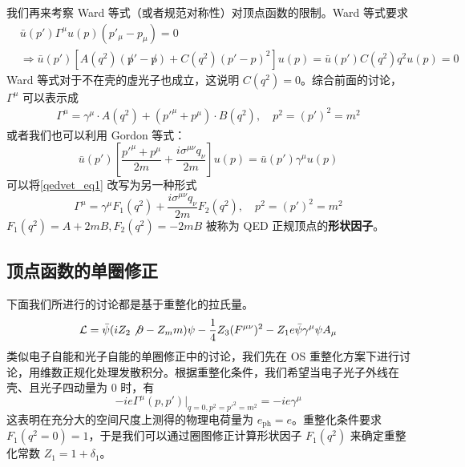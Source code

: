 我们再来考察 Ward 等式（或者规范对称性）对顶点函数的限制。Ward 等式要求
\begin{equation}
\begin{aligned}
&\bar u(p')\Gamma^\mu u(p) (p'_\mu-p_\mu) = 0\\
&\Rightarrow \bar u(p')\left[A(q^2)(\not p'-\not p)+ C(q^2)(p'-p)^2\right] u(p)=\bar u(p')C(q^2)q^2 u(p)=0
\end{aligned}
\end{equation}
Ward 等式对于不在壳的虚光子也成立，这说明 $C(q^2) = 0$。综合前面的讨论，$\Gamma^\mu$ 可以表示成
\begin{equation}\label{qedvet_eq1}
\begin{aligned}
\Gamma^\mu = \gamma^\mu\cdot A(q^2) + ({p'}^\mu + p^\mu)\cdot B(q^2),\quad p^2=(p')^2=m^2
\end{aligned}
\end{equation}
或者我们也可以利用 Gordon 等式：
\begin{equation}
\bar u(p') \left[\frac{{p'}^\mu+p^\mu}{2m}+\frac{i\sigma^{\mu\nu}q_\nu}{2m}\right]u(p)=\bar u(p')\gamma^\mu u(p)
\end{equation}
可以将\autoref{qedvet_eq1} 改写为另一种形式
\begin{equation}
\Gamma^\mu = \gamma^\mu F_1(q^2) + \frac{i\sigma^{\mu\nu}q_\nu}{2m} F_2(q^2),\quad p^2=(p')^2=m^2
\end{equation}
$F_1(q^2) = A+2mB,F_2(q^2)=-2mB$ 被称为 QED 正规顶点的\textbf{形状因子}。
\subsection{顶点函数的单圈修正}
下面我们所进行的讨论都是基于重整化的拉氏量。
\begin{equation}
\mathcal{L}=\bar\psi (iZ_2\not\partial - Z_m m)\psi - \frac{1}{4}Z_3 (F^{\mu\nu})^2-Z_1 e \bar\psi \gamma^\mu\psi A_\mu
\end{equation}
类似电子自能和光子自能的单圈修正中的讨论，我们先在 OS 重整化方案下进行讨论，用维数正规化处理发散积分。根据重整化条件，我们希望当电子光子外线在壳、且光子四动量为 $0$ 时，有
\begin{equation}
-ie\Gamma^\mu(p,p')|_{q=0,p^2={p'}^2=m^2} = -ie\gamma^\mu
\end{equation}
这表明在充分大的空间尺度上测得的物理电荷量为 $e_{\text{ph}}=e$。重整化条件要求 $F_1(q^2=0)=1$，于是我们可以通过圈图修正计算形状因子 $F_1(q^2)$ 来确定重整化常数 $Z_1 = 1+\delta_1$。

